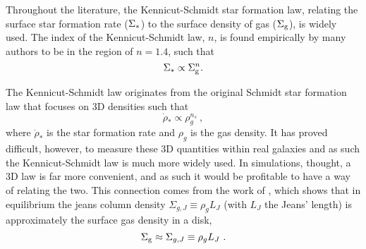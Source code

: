 Throughout the literature, the Kennicut-Schmidt star formation law, relating the surface star formation rate ($\Sigma_*$) to the surface density of gas ($\Sigma_\mathrm{g}$), is widely used.
The index of the Kennicut-Schmidt law, $n$, is found empirically by many authors to be in the region of $n=1.4$, such that
\begin{equation}
\label{eqn:ks}
\Sigma_* \propto \Sigma_\mathrm{g}^n.
\end{equation}

The Kennicut-Schmidt law originates from the original Schmidt star formation law that focuses on 3D densities such that
\begin{equation}
\label{eqn:s}
\dot{\rho}_* \propto \rho_g^{n_s}~,
\end{equation}
where $\dot{\rho}_*$ is the star formation rate and $\rho_g$ is the gas density.
It has proved difficult, however, to measure these 3D quantities within real galaxies and as such the Kennicut-Schmidt law is much more widely used.
In simulations, thought, a 3D law is far more convenient, and as such it would be profitable to have a way of relating the two. 
This connection comes from the work of \citet{schaye_model-independent_2001}, which shows that in equilibrium the jeans column density $\Sigma_{g, J} \equiv \rho_g L_J$ (with $L_J$ the Jeans' length) is approximately the surface gas density in a disk,
\begin{equation}
\label{eqn:s04}
\Sigma_\mathrm{g} \approx \Sigma_{g, J} \equiv \rho_g L_J~.
\end{equation}
